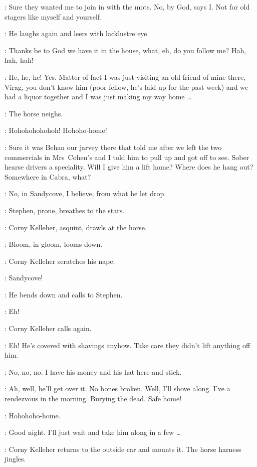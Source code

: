 \Corny:
Sure they wanted me to join in with the mots.
No, by God, says I.
Not for old stagers like myself and yourself.

:
He laughs again and leers with lacklustre eye.

\Corny:
Thanks be to God we have it in the house, what, eh, do you follow me?
Hah, hah, hah!

\Bloom:
He, he, he!
Yes.
Matter of fact I was just visiting an old friend of mine there,
Virag, you don't know him (poor fellow, he's laid up for the past week)
and we had a liquor together and I was just making my way home \ldots

:
The horse neighs.

\Horse:
Hohohohohohoh!
Hohoho-home!

\Corny:
Sure it was Behan our jarvey there that told me
after we left the two commercials in Mrs~Cohen's
and I told him to pull up and got off to see.
Sober hearse drivers a speciality.
Will I give him a lift home?
Where does he hang out?
Somewhere in Cabra, what?

\Bloom:
No, in Sandycove, I believe, from what he let drop.

:
Stephen, prone, breathes to the stars.

:
Corny Kelleher, asquint, drawls at the horse.

:
Bloom, in gloom, looms down.

:
Corny Kelleher scratches his nape.

\Corny:
Sandycove!

:
He bends down and calls to Stephen.

\Corny:
Eh!

:
Corny Kelleher calls again.

\Corny:
Eh!
He's covered with shavings anyhow.
Take care they didn't lift anything off him.

\Bloom:
No, no, no.
I have his money and his hat here and stick.

\Corny:
Ah, well, he'll get over it.
No bones broken.
Well, I'll shove along.
I've a rendezvous in the morning.
Burying the dead.
Safe home!

\Horse:
Hohohoho-home.

\Bloom:
Good night.
I'll just wait and take him along in a few \ldots

:
Corny Kelleher returns to the outside car and mounts it.
The horse harness jingles.

